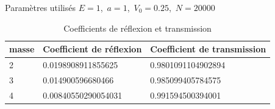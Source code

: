 \begin{table}[!ht]
\centering
Paramètres utilisés $E=1$,\ $a=1$,\ $V_{0}=0.25$,\ $N=20000$\\
\begin{tabular}{|l|l|l|}
\hline  masse & Coefficient de réflexion  & Coefficient de transmission \\
\hline  2 & 0.0198908911855625 &  0.9801091104902894\\
\hline 3 & 0.014900596680466 & 0.985099405784575\\ 
\hline 4 & 0.00840550290054031&0.991594500394001\\
\hline
\end{tabular}
\caption{Coefficients de réflexion et transmission}
\label{tab}
\end{table}
